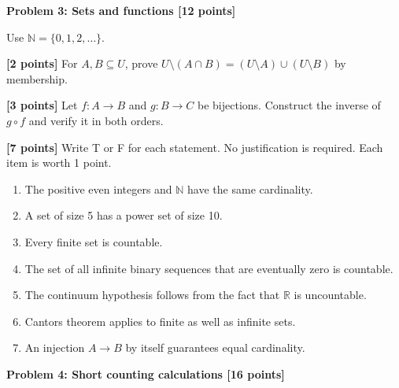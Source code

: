 \documentclass[12pt,letterpaper]{article}
\newcommand{\problemheading}[2][5\baselineskip]{\Needspace{#1}\par\noindent\hspace*{-0.625in}\textbf{#2}\par\nobreak\vspace{0.3em}}
\newcommand{\examspace}[1]{\par\vspace*{#1cm}}
\begin{document}
\clearpage
\vspace*{0.21in}
\problemheading{Problem 3: Sets and functions [12 points]}
\begin{list}{}{\setlength{\leftmargin}{0.25in}\setlength{\rightmargin}{0.25in}}\item[]
Use $\mathbb N=\{0,1,2,\ldots\}$.
\begin{description}[font=\normalfont,leftmargin=1.2em,labelsep=0.4em]
\item[(a)] \textbf{[2 points]} For $A,B\subseteq U$, prove $U\setminus(A\cap B)=(U\setminus A)\cup(U\setminus B)$ by membership.
\examspace{3}
\Needspace{\dimexpr 5cm+4\baselineskip\relax}
\item[(b)] \textbf{[3 points]} Let $f:A\to B$ and $g:B\to C$ be bijections. Construct the inverse of $g\circ f$ and verify it in both orders.
\examspace{5}
\Needspace{\dimexpr 1cm+4\baselineskip\relax}
\item[(c)] \textbf{[7 points]} Write T or F for each statement. No justification is required. Each item is worth 1 point.\begin{enumerate}[label=(\roman*)]\item The positive even integers and $\mathbb N$ have the same cardinality.\item A set of size 5 has a power set of size 10.\item Every finite set is countable.\item The set of all infinite binary sequences that are eventually zero is countable.\item The continuum hypothesis follows from the fact that $\mathbb R$ is uncountable.\item Cantor\textquotesingle s theorem applies to finite as well as infinite sets.\item An injection $A\to B$ by itself guarantees equal cardinality.\end{enumerate}
\examspace{1}
\end{description}
\end{list}
\clearpage
\vspace*{0.21in}
\problemheading{Problem 4: Short counting calculations [16 points]}
\end{document}
